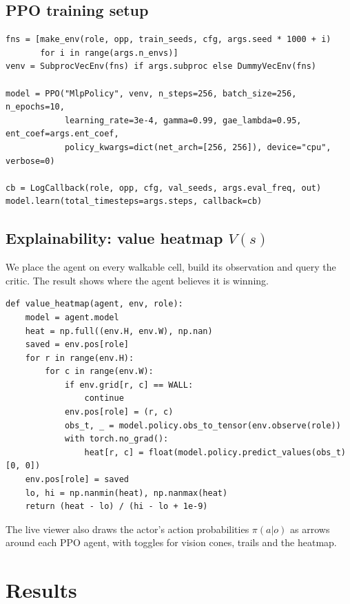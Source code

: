 \documentclass[11pt,a4paper]{article}
\newcommand{\code}[1]{\texttt{#1}}
\begin{document}
\subsection{PPO training setup}
\begin{lstlisting}[title={\code{training/train.py} -- model construction and training}]
fns = [make_env(role, opp, train_seeds, cfg, args.seed * 1000 + i)
       for i in range(args.n_envs)]
venv = SubprocVecEnv(fns) if args.subproc else DummyVecEnv(fns)

model = PPO("MlpPolicy", venv, n_steps=256, batch_size=256, n_epochs=10,
            learning_rate=3e-4, gamma=0.99, gae_lambda=0.95, ent_coef=args.ent_coef,
            policy_kwargs=dict(net_arch=[256, 256]), device="cpu", verbose=0)

cb = LogCallback(role, opp, cfg, val_seeds, args.eval_freq, out)
model.learn(total_timesteps=args.steps, callback=cb)
\end{lstlisting}

\subsection{Explainability: value heatmap $V(s)$}
\label{sec:viz}
We place the agent on every walkable cell, build its observation and query the critic. The result
shows where the agent believes it is winning.
\begin{lstlisting}[title={\code{visualization/live.py} -- value\_heatmap}]
def value_heatmap(agent, env, role):
    model = agent.model
    heat = np.full((env.H, env.W), np.nan)
    saved = env.pos[role]
    for r in range(env.H):
        for c in range(env.W):
            if env.grid[r, c] == WALL:
                continue
            env.pos[role] = (r, c)
            obs_t, _ = model.policy.obs_to_tensor(env.observe(role))
            with torch.no_grad():
                heat[r, c] = float(model.policy.predict_values(obs_t)[0, 0])
    env.pos[role] = saved
    lo, hi = np.nanmin(heat), np.nanmax(heat)
    return (heat - lo) / (hi - lo + 1e-9)
\end{lstlisting}
The live viewer also draws the actor's action probabilities $\pi(a|o)$ as arrows around each PPO
agent, with toggles for vision cones, trails and the heatmap.

\section{Results}
\end{document}
